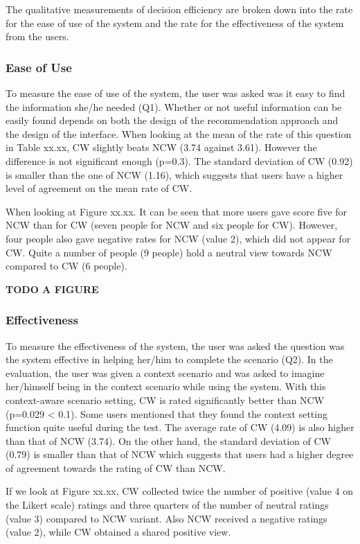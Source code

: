 The qualitative measurements of decision efficiency are broken down into the rate for the ease of use of the system and the rate for the effectiveness of the system from the users.

\subsubsection{Ease of Use} \label{sec:results_de_eu}

To measure the ease of use of the system, the user was asked was it easy to find the information she/he needed (Q1). Whether or not useful information can be easily found depends on both the design of the recommendation approach and the design of the interface. When looking at the mean of the rate of this question in Table xx.xx, CW slightly beats NCW (3.74 against 3.61). However the difference is not significant enough (p=0.3). The standard deviation of CW (0.92) is smaller than the one of NCW (1.16), which suggests that users have a higher level of agreement on the mean rate of CW.

When looking at Figure xx.xx. It can be seen that more users gave score five for NCW than for CW (seven people for NCW and six people for CW). However, four people also gave negative rates for NCW (value 2), which did not appear for CW. Quite a number of people (9 people) hold a neutral view towards NCW compared to CW (6 people).

\textbf{TODO A FIGURE}

\subsubsection{Effectiveness} \label{sec:results_de_e}

To measure the effectiveness of the system, the user was asked the question was the system effective in helping her/him to complete the scenario (Q2). In the evaluation, the user was given a context scenario and was asked to imagine her/himself being in the context scenario while using the system. With this context-aware scenario setting, CW is rated significantly better than NCW (p=0.029 < 0.1). Some users mentioned that they found the context setting function quite useful during the test. The average rate of CW (4.09) is also higher than that of NCW (3.74). On the other hand, the standard deviation of CW (0.79) is smaller than that of NCW which suggests that users had a higher degree of agreement towards the rating of CW than NCW.

If we look at Figure xx.xx, CW collected twice the number of positive (value 4 on the Likert scale) ratings and three quarters of the number of neutral ratings (value 3) compared to NCW variant. Also NCW received a negative ratings (value 2), while CW obtained a shared positive view.

